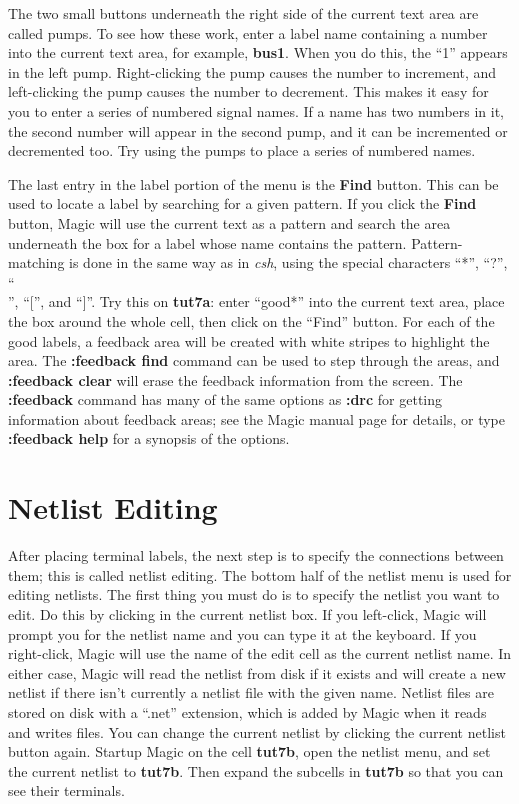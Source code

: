 \documentclass[letterpaper,twoside,12pt]{article}
\begin{document}
The two small buttons underneath the right side of the current
text area are called pumps.  To see how these work, enter a label
name containing a number into the current text area, for example,
{\bfseries bus1}.  When you do this, the ``1'' appears in the left
pump.  Right-clicking the pump causes the number to increment,
and left-clicking the pump causes the number to decrement.  This
makes it easy for you to enter a series of numbered signal names.
If a name has two numbers in it, the second number will appear in
the second pump, and it can be incremented or decremented too.
Try using the pumps to place a series of numbered names.

The last entry in the label portion of the menu is the {\bfseries Find}
button.  This can be used to locate a label by searching for
a given pattern.  If you click the {\bfseries Find} button, Magic
will use the current text as a pattern and
search the area underneath the box for a label whose name
contains the pattern.  Pattern-matching is done in the same
way as in {\itshape csh}, using the special characters ``*'',
``?'', ``\\'', ``['', and ``]''.  Try this on {\bfseries tut7a}:
enter ``good*'' into the current text area, place the box around
the whole cell, then click on the ``Find'' button.  For each of
the good labels, a feedback area will be created with white
stripes to highlight the area.  The {\bfseries :feedback find} command
can be used to step through the areas, and {\bfseries :feedback clear}
will erase the feedback information from the screen.  The {\bfseries :feedback}
command has many of the same options as {\bfseries :drc} for getting
information about feedback areas;  see the Magic manual page for
details, or type {\bfseries :feedback help} for a synopsis of the options.


\section{Netlist Editing}

After placing terminal labels, the next step is to specify the connections
between them; this is called netlist editing.
The bottom half of the netlist menu is used for editing netlists.
The first thing you must do is to specify the netlist you want
to edit.  Do this by clicking in the current netlist box.  If
you left-click, Magic will prompt you for the netlist name and
you can type it at the keyboard.  If you right-click, Magic will
use the name of the edit cell as the current netlist name.  In
either case, Magic will read the netlist from disk if it exists
and will create a new netlist if there isn't currently a netlist
file with the given name.  Netlist
files are stored on disk with a ``.net'' extension, which is
added by Magic when it reads and writes files.  You can
change the current netlist by clicking the current
netlist button again.  Startup
Magic on the cell {\bfseries tut7b}, open the netlist
menu, and set the current netlist to {\bfseries tut7b}.  Then
expand the subcells in {\bfseries tut7b} so that you can see
their terminals.
\end{document}
